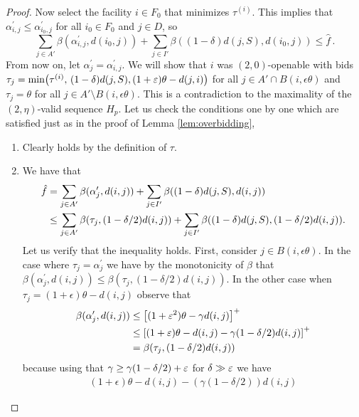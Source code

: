 \begin{proof}
Now select the facility $i \in F_0$ that minimizes $\tau^{(i)}$. This implies that $\alpha^\prime_{i,j} \leq \alpha^\prime_{i_0,j}$ for all $i_0 \in F_0$ and $j \in D$, so
\begin{equation}
    \label{eq:minimal-facility-robust}
    \sum_{j \in A'} \beta(\alpha^\prime_{i,j}, d(i_0,j)) + \sum_{j \in I'} \beta((1-\delta)d(j, S), d(i_0,j)) \le \hat f\,.
\end{equation}
From now on, let $\alpha_j^\prime = \alpha_{i,j}^\prime$.
We will show that $i$ was $(2, 0)$-openable with bids $\tau_j = \min\bigl(\tau^{(i)},\,(1-\delta)d(j,S), (1+\varepsilon) \theta - d(j,i)\bigr)$ for all $j \in A' \cap B(i,\epsilon \theta)$ and $\tau_j = \theta$ for all $j \in A'\setminus B(i,\epsilon \theta)$. This is a contradiction to the maximality of the $(2,\eta)$-valid sequence $H_p$.
Let us check the conditions one by one which are satisfied just as in the proof of Lemma \ref{lem:overbidding},
\begin{enumerate}
        \item[\textbf{(i)} - \textbf{(ii)}] Clearly holds by the definition of $\tau$.
        \item[\textbf{(iii)}]
        We have that 
        \begin{align*}
            \hat f & = \sum_{j \in A'} \beta(\alpha_j^\prime, d(i,j)) + \sum_{j \in I'} \beta((1-\delta)d(j, S), d(i,j)) \\ 
            & \le \sum_{j \in A'} \beta(\tau_j, (1- \delta/2)d(i,j)) + \sum_{j \in I'} \beta((1-\delta)d(j, S), (1- \delta/2)d(i,j)).
        \end{align*}
        Let us verify that the inequality holds. First, consider $j \in B(i,\epsilon \theta)$. In the case where $\tau_j = \alpha^\prime_j$ we have by the monotonicity of $\beta$ that $\beta(\alpha_j^\prime, d(i,j)) \le \beta(\tau_j,  (1-\delta/2) d(i,j))$. In the other case when $\tau_j = (1+\epsilon) \theta - d(i,j)$ observe that
        \begin{align*}
            \beta(\alpha_j^\prime, d(i,j)) & \le \left[(1+\varepsilon^2)\theta - \gamma  d(i,j)\right]^+ \\ & \le \left[(1+\varepsilon)\theta - d(i,j) - \gamma (1-\delta/2) d(i,j)\right]^+ 
            \\ & = \beta(\tau_j,  (1-\delta/2) d(i,j))
        \end{align*}
        because using that $\gamma \geq \gamma (1-\delta/2) + \varepsilon$ for $\delta \gg \varepsilon$ we have
    \begin{align*}
        (1+\epsilon) \theta - d(i, j)-(\gamma (1-\delta/2)) d(i, j)

\end{align*}
\end{enumerate}
\end{proof}
